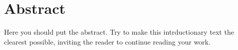 \chapter*{Abstract}

Here you should put the abstract. Try to make this intrductionary text
the clearest possible, inviting the reader to continue reading your
work.

